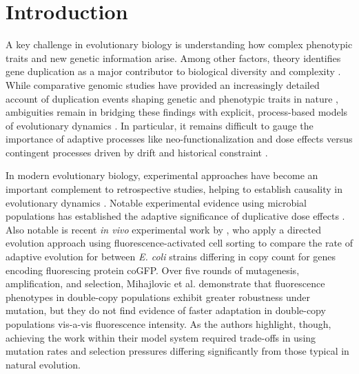 \section{Introduction} \label{sec:introduction}

A key challenge in evolutionary biology is understanding how complex phenotypic traits and new genetic information arise.
Among other factors, theory identifies gene duplication as a major contributor to biological diversity and complexity \citep{Zhang2003,Otto2000,Wagner2008,Crow:2006role,Magadum:2013wu,Metz:chromosomeDuplication1947,Hu:2010ea,Castellanos2024,Lynch2000b,Lynch2003}.
While comparative genomic studies have provided an increasingly detailed account of duplication events shaping genetic and phenotypic traits in nature \citep{Zhang2014,teichmann_structural_1998,Teichmann:2004cz,DuBose2024,Voordeckers2012,Pougach2014,Moore2003}, ambiguities remain in bridging these findings with explicit, process-based models of evolutionary dynamics \citep{Welch2016}.
In particular, it remains difficult to gauge the importance of adaptive processes like neo-functionalization and dose effects versus contingent processes driven by drift and historical constraint \citep{Innan2010,Zhang:2003fw,Kuzmin2022}.

In modern evolutionary biology, experimental approaches have become an important complement to retrospective studies, helping to establish causality in evolutionary dynamics \citep{Kawecki2012,Elena2003}.
Notable experimental evidence using microbial populations has established the adaptive significance of duplicative dose effects \citep{Tong2025,Dhar2014,Nsvall2012}.
Also notable is recent \textit{in vivo} experimental work by \citet{mihajlovic2025direct}, who apply a directed evolution approach using fluorescence-activated cell sorting to compare the rate of adaptive evolution for between \textit{E. coli} strains differing in copy count for genes encoding fluorescing protein coGFP.
Over five rounds of mutagenesis, amplification, and selection, Mihajlovic et al. demonstrate that fluorescence phenotypes in double-copy populations exhibit greater robustness under mutation, but they do not find evidence of faster adaptation in double-copy populations vis-a-vis fluorescence intensity.
As the authors highlight, though, achieving the work within their model system required trade-offs in using mutation rates and selection pressures differing significantly from those typical in natural evolution.

